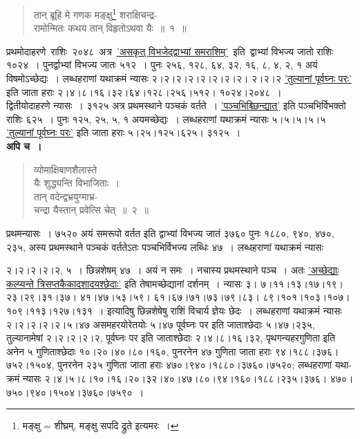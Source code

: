 \documentclass[11pt, openany]{book}
\begin{document}
\newpage

\begin{quote}
{\ex तान् ब्रूहि मे गणक मङ्क्षु\renewcommand{\thefootnote}{*}\footnote{मङ्क्षु = शीघ्रम्, मङ्क्षु सपदि द्रुते इत्यमरः~।} शराक्षिचन्द्र-\\
रामोन्मितः कथय तान् विहृतोऽथवा यैः~॥~१~॥}	
\end{quote}

प्रथमोदाहरणे \,राशिः \,२०४८ \,अत्र \,\hyperref[11.1]{'असकृत् विभजेद्द्वाभ्यां समराशिम्'} \,इति \,द्वाभ्यां विभज्य जातो राशिः १०२४~। पुनर्द्वाभ्यां विभज्य जातः ५१२~। पुनः २५६, १२८, ६४, ३२, १६, ८, ४, २, १ अयं विषमोऽच्छेद्यः~। लब्धहराणां यथाक्रमं न्यासः २।२।२।२।२।२।२।२। २।२।२ \hyperref[11.8]{'तुल्यानां पूर्वघ्नः परः'} इति जाता हराः २।४।८।१६।३२।६४।१२८।२५६।५१२। १०२४।२०४८~। \\

द्वितीयोदाहरणे न्यासः~। ३१२५ अत्र प्रथमस्थाने पञ्चकं वर्तते~। \hyperref[11.1]{'पञ्चभिश्च्छिन्द्यात्'} इति पञ्चभिर्विभक्तो राशिः ६२५~। पुनः १२५, २५, ५, १ अयमच्छेद्यः~। लब्धहराणां यथाक्रमं न्यासः ५।५।५।५।५ \hyperref[11.8]{'तुल्यानां पूर्वघ्नः परः'} इति जाता हराः ५।२५।१२५।६२५। ३१२५~। \\

\textbf{अपि च~।} 

\begin{quote}
{\ex व्योमाक्षिबाणशैलास्ते\\
यैः शुद्ध्यन्ति विभाजिताः~।\\
तान् वदेन्द्वभ्रयुग्माभ्र-\\
चन्द्रा यैस्तान् प्रवेत्सि चेत्~॥~२~॥}	
\end{quote}

प्रथमन्यासः~। ७५२० अयं समरूपो वर्तत इति द्वाभ्यां विभज्य जातं ३७६० पुनः १८८०, ९४०, ४७०, २३५, अस्य प्रथमस्थाने पञ्चकं
वर्ततेऽतः पञ्चभिर्विभज्य लब्धिः ४७~। लब्धहराणां यथाक्रमं न्यासः 

\newpage

\noindent २।२।२।२।२, ५~। छिन्नशेषम् ४७~। अयं न समः~। नचास्य प्रथमस्थाने पञ्च~। अतः \hyperref[11.3]{'अच्छेद्याः कल्प्यन्ते त्रिसप्तकैकादशादयश्छेदाः'} इति तेषामच्छेद्यानां दर्शनम्~। न्यासः ३। ७।११।१३।१७।१९। २३।२९।३१।३७। ४१।४७।५३।५९। ६१।६७।७१।७३।७९।८३। ८९।१०१।१०३।१०७।१०९।११३।१२७।१३१~। इत्यादिषु छिन्नशेषेषु राशिं विचार्य ज्ञेयः छेदः~। लब्धहराणां यथाक्रमं न्यासः २।२।२।२।२।५।४७ असमहरयोरेतयोः ५।४७ पूर्वघ्नः पर इति जाताश्छेदाः ५।४७।२३५, तुल्यानामेषां २।२।२।२।२, पूर्वघ्नः पर इति जाताश्छेदाः २।४।८।१६।३२, पृथगन्यहरगुणिता इति अनेन ५ गुणिताश्छेदाः १०।२०।४०।८०।१६०, पुनरनेन ४७ गुणिता जाता हराः ९४।१८८।३७६।७५२।१५०४, पुनरनेन २३५ गुणिता जाता हराः ४७०।९४०।१८८०।३७६०।७५२०; लब्धहराणां यथा-क्रमं \;न्यासः \;२।४।५।८।१०।१६।२०।३२।४०।४७।८०।९४।१६०।१८८।२३५।३७६। ४७०।७५०।९४०।१५०४।३७६०।७५९०~। \\
\end{document}
